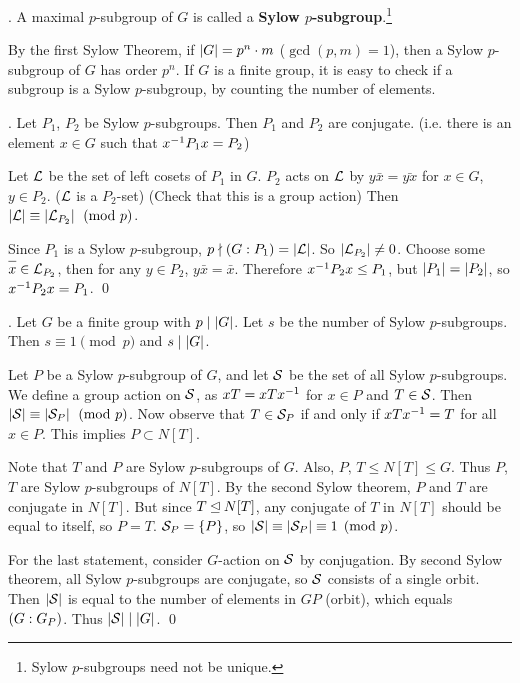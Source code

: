 \bigskip

.  A maximal \(p\)-subgroup of \(G\) is called a \textbf{Sylow \(p\)-subgroup}.\footnote{Sylow \(p\)-subgroups need not be unique.}

By the first Sylow Theorem, if \(\left| G \right| = p^n \cdot m\) (\(\gcd(p, m) = 1\)), then a Sylow \(p\)-subgroup of \(G\) has order \(p^n\). If \(G\) is a finite group, it is easy to check if a subgroup is a Sylow \(p\)-subgroup, by counting the number of elements.

\thm.  Let \(P_1\), \(P_2\) be Sylow \(p\)-subgroups. Then \(P_1\) and \(P_2\) are conjugate. (i.e. there is an element \(x \in G\) such that \(x^{-1} P_1 x = P_2\))

\pf Let \(\mathcal{L}\) be the set of left cosets of \(P_1\) in \(G\). \(P_2\) acts on \(\mathcal{L}\) by \(y \bar{x} = \bar{yx}\) for \(x \in G\), \(y \in P_2\). (\(\mathcal{L}\) is a \(P_2\)-set) (Check that this is a group action) Then \(\left| \mathcal{L} \right| \equiv \left| \mathcal{L}_{P_2} \right| \pmod p\).

Since \(P_1\) is a Sylow \(p\)-subgroup, \(p \nmid \left(G : P_1\right) = \left| \mathcal{L} \right|\). So \(\left| \mathcal{L}_{P_2} \right| \neq 0\). Choose some \(\bar{x} \in \mc{L}_{P_2}\), then for any \(y \in P_2\), \(y\bar{x} = \bar{x}\). Therefore \(x^{-1} P_2 x \leq P_1\), but \(\left| P_1 \right| = \left| P_2 \right|\), so \(x^{-1} P_2 x = P_1\). \qed

\bigskip

\thm.  Let \(G\) be a finite group with \(p \mid \left| G \right|\). Let \(s\) be the number of Sylow \(p\)-sub\-groups. Then \(s \equiv 1 \pmod p\) and \(s \mid \left| G \right|\).

\pf Let \(P\) be a Sylow \(p\)-subgroup of \(G\), and let \(\mathcal{S}\) be the set of all Sylow \(p\)-subgroups. We define a group action on \(\mathcal{S}\), as \(xT = xTx^{-1}\) for \(x \in P\) and \(T \in \mathcal{S}\). Then \(\left| \mathcal{S} \right| \equiv \left| \mathcal{S}_P \right| \pmod p\). Now observe that \(T \in \mathcal{S}_P\) if and only if \(xTx^{-1} = T\) for all \(x \in P\). This implies \(P \subset N[T]\).

Note that \(T\) and \(P\) are Sylow \(p\)-subgroups of \(G\). Also, \(P,\, T \leq N[T] \leq G\). Thus \(P\), \(T\) are Sylow \(p\)-subgroups of \(N[T]\). By the second Sylow theorem, \(P\) and \(T\) are conjugate in \(N[T]\). But since \(T \unlhd N[T]\), any conjugate of \(T\) in \(N[T]\) should be equal to itself, so \(P = T\). \(\mathcal{S}_P = \{P\}\), so \(\left| \mathcal{S} \right| \equiv \left| \mathcal{S}_P \right| \equiv 1 \pmod p\).

For the last statement, consider \(G\)-action on \(\mathcal{S}\) by conjugation. By second Sylow theorem, all Sylow \(p\)-subgroups are conjugate, so \(\mathcal{S}\) consists of a single orbit. Then \(\left| \mathcal{S} \right|\) is equal to the number of elements in \(GP\) (orbit), which equals \(\left(G : G_P\right)\). Thus \(\left| \mathcal{S} \right| \mid \left| G \right|\). \qed

